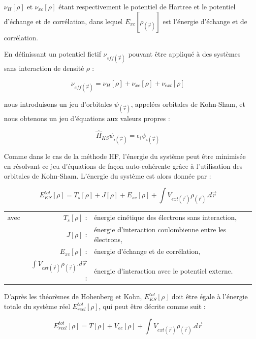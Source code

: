 	\noindent $\nu_{H}[\rho]$ et $\nu_{xc}[\rho]$ étant respectivement le potentiel de Hartree et le potentiel d'échange et de corrélation, dans lequel $E_{xc}[\rho_{(\vec{r})}]$ est l'énergie d'échange et de corrélation.
	
	En définissant un potentiel fictif $\nu_{eff(\vec{r})}$ pouvant être appliqué à des systèmes sans interaction de densité $\rho$ :
	
	\begin{equation}
	\nu_{eff(\vec{r})} = \nu_{H}[\rho] + \nu_{xc}[\rho] + \nu_{ext}[\rho]
	\end{equation}
	
	\noindent nous introduisons un jeu d'orbitales $\psi_{(\vec{r})}$, appelées orbitales de Kohn-Sham, et nous obtenons un jeu d'équations aux valeurs propres :
	
	\begin{equation}
	\hat{H}_{KS} \psi_{i(\vec{r})} = \epsilon_{i} \psi_{i(\vec{r})}
	\end{equation}
	
	Comme dans le cas de la méthode HF, l'énergie du système peut être minimisée en résolvant ce jeu d'équations de façon auto-cohérente grâce à l'utilisation des orbitales de Kohn-Sham. L'énergie du système est alors donnée par :
	
	\begin{equation}
	E_{KS}^{tot}[\rho] = T_{s}[\rho] + J[\rho] + E_{xc}[\rho] + \int V_{ext(\vec{r})}\rho_{(\vec{r})} .d\vec{r}
	\end{equation}
	
	\begin{flushleft}
		\begin{tabular}{@{}lrp{10cm}}
			avec & $T_{s}[\rho]$ : & énergie cinétique des électrons sans interaction, \\
			& $J[\rho]$ : & énergie d'interaction coulombienne entre les électrons, \\
			& $E_{xc}[\rho]$ : & énergie d'échange et de corrélation, \\
			& $\int V_{ext(\vec{r})}\rho_{(\vec{r})} .d\vec{r}$ : & énergie d'interaction avec le potentiel externe. 
		\end{tabular}
	\end{flushleft}
	
	D'après les théorèmes de Hohenberg et Kohn, $E_{KS}^{tot}[\rho]$ doit être égale à l'énergie totale du système réel $E_{reel}^{tot}[\rho]$, qui peut être décrite comme suit :
	
	\begin{equation}
	E_{reel}^{tot}[\rho] = T[\rho] + V_{ee}[\rho] + \int V_{ext(\vec{r})}\rho_{(\vec{r})} .d\vec{r}
	\end{equation}
	
